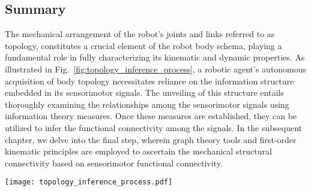 \subsection{Summary}
The mechanical arrangement of the robot's joints and links referred to as topology, constitutes a crucial element of the robot body schema, playing a fundamental role in fully characterizing its kinematic and dynamic properties. As illustrated in Fig.~\ref{fig:topology_inference_process}, a robotic agent's autonomous acquisition of body topology necessitates reliance on the information structure embedded in its sensorimotor signals. The unveiling of this structure entails thoroughly examining the relationships among the sensorimotor signals using information theory measures. Once these measures are established, they can be utilized to infer the functional connectivity among the signals. In the subsequent chapter, we delve into the final step, wherein graph theory tools and first-order kinematic principles are employed to ascertain the mechanical structural connectivity based on sensorimotor functional connectivity.


\begin{figure*}[!t]
	\centering	
	\hspace*{\fill}
	\texttt{[image: topology\_inference\_process.pdf]}
	\hspace*{\fill}	
	\caption[] {\label{fig:topology_inference_process}\textbf{Topology inference process.} Extracting the robot's mechanical topology from the relationships among the sensorimotor signals involves combining tools from information and graph theory to determine the functional connectivity between signals and using it to infer the mechanical structural connectivity.}
\end{figure*}



